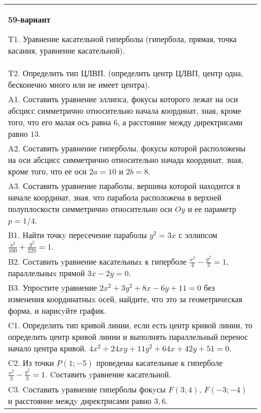 \documentclass{article}
\begin{document}
\begin{tabular}{m{17cm}}
\textbf{59-вариант}
\newline

T1. Уравнение касательной гиперболы (гипербола, прямая, точка касания, уравнение касательной).\\

T2. Определить тип ЦЛВП. (определить центр ЦЛВП, центр одна, бесконечно много или не имеет центра).\\

A1. Составить уравнение эллипса, фокусы которого лежат на оси абсцисс симметрично относительно начала координат, зная, кроме того, что его малая ось равна $6$, а расстояние между директрисами равно $13$.\\

A2. Составить уравнение гиперболы, фокусы которой расположены на оси абсцисс симметрично относительно начада координат, зная, кроме того, что ее оси $2a=10$ и $2b=8$.\\

A3. Составить уравнение параболы, вершина которой находится в начале координат, зная, что парабола расположена в верхней полуплоскости симметрично относительно оси $Oy$ и ее параметр $p=1/4$.\\

B1. Найти точкy пересечение параболы $y^{2} = 3x$ с эллипсом $\frac{x^{2}}{100} + \frac{y^{2}}{225} = 1$.  \\

B2. Составить yравнение касательныx к гиперболе $\frac{x^{2}}{4} - \frac{y^{2}}{5} = 1$, параллельныx прямой $3x - 2y = 0$.  \\

B3. Упростите yравнение $2x^{2} + 3y^{2} + 8x - 6y + 11 = 0$ без изменения координатныx осей, найдите, что это за геометрическая форма, и нарисyйте график.  \\

C1. Определить тип кривой линии, если есть центр кривой линии, то определить центр кривой линии и выполнять параллельный перенос начало центра кривой. $4x^{2}+24xy+11y^{2}+64x+42y+51=0$.  \\

C2. Из точки $P(1;-5)$ проведены касательные к гиперболе $\frac{x^{2}}{3}-\frac{y^{2}}{5}=1$. Cоставить yравнение касательной.\\

C3. Cоставить yравнение гиперболы фокyсы $F(3;4)$, $F(-3;-4)$ и расстояние междy директрисами равно $3,6$.  \\

\end{tabular}
\vspace{1cm}
\end{document}
